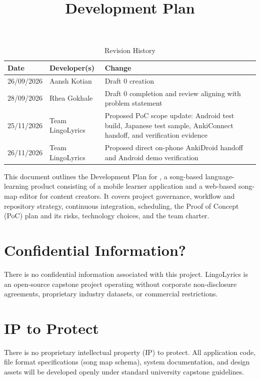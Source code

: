 \documentclass{article}
\title{Development Plan\\\progname}
\author{\authname}
\date{}
\begin{document}
\maketitle

\begin{table}[hp]
\caption{Revision History} \label{TblRevisionHistory}
\begin{tabularx}{\textwidth}{llX}
\toprule
\textbf{Date} & \textbf{Developer(s)} & \textbf{Change}\\
\midrule
26/09/2026 & Aansh Kotian & Draft 0 creation \\
28/09/2026 & Rhea Gokhale & Draft 0 completion and review aligning with problem statement \\
25/11/2026 & Team LingoLyrics & Proposed PoC scope update: Android test build, Japanese test sample, AnkiConnect handoff, and verification evidence \\
26/11/2026 & Team LingoLyrics & Proposed direct on-phone AnkiDroid handoff and Android demo verification \\
\bottomrule
\end{tabularx}
\end{table}

\newpage{}

This document outlines the Development Plan for \progname{}, a song-based language-learning product consisting of a mobile learner application and a web-based song-map editor for content creators. It covers project governance, workflow and repository strategy, continuous integration, scheduling, the Proof of Concept (PoC) plan and its risks, technology choices, and the team charter.
 
\section{Confidential Information?}

There is no confidential information associated with this project. LingoLyrics is an open-source capstone project operating without corporate non-disclosure agreements, proprietary industry datasets, or commercial restrictions.

\section{IP to Protect}

There is no proprietary intellectual property (IP) to protect. All application code, file format specifications (song map schema), system documentation, and design assets will be developed openly under standard university capstone guidelines.
\end{document}
